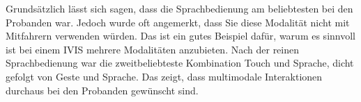 Grundsätzlich lässt sich sagen, dass die Sprachbedienung am beliebtesten bei den Probanden war. Jedoch wurde oft angemerkt, dass Sie diese Modalität nicht mit Mitfahrern verwenden würden. Das ist ein gutes Beispiel dafür, warum es sinnvoll ist bei einem IVIS mehrere Modalitäten anzubieten. Nach der reinen Sprachbedienung war die zweitbeliebteste Kombination Touch und Sprache, dicht gefolgt von Geste und Sprache. Das zeigt, dass multimodale Interaktionen durchaus bei den Probanden gewünscht sind. 